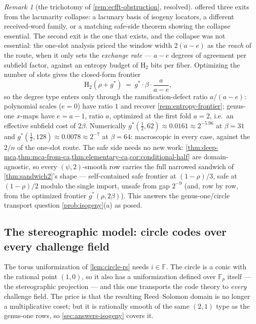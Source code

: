 \documentclass[11pt]{article}
\theoremstyle{definition}
\theoremstyle{remark}
\newtheorem{remark}[remark]{Remark}
\newcommand{\F}{\mathbb{F}}
\newcommand{\Hb}{\mathrm{H}_2}
\begin{document}
\begin{remark}[the trichotomy of \cref{rem:ecfft-obstruction}, resolved]\label{rem:trichotomy}
 offered three exits from the lacunarity collapse: a lacunary basis of isogeny locators, a different received-word family, or a matching safe-side theorem showing the collapse essential. The second exit is the one that exists, and the collapse was not essential: the one-slot analysis priced the window width $2(a-e)$ as the \emph{reach} of the route, when it only sets the \emph{exchange rate} --- $a-e$ degrees of agreement per subfield factor, against an entropy budget of $\Hb$ bits per fiber. Optimizing the number of slots gives the closed-form frontier
\[
\Hb(\rho+g^*)\ =\ g^*\cdot\beta\cdot\frac a{a-e},
\]
so the degree type enters only through the ramification-defect ratio $a/(a-e)$: polynomial scales ($e=0$) have ratio $1$ and recover \cref{rem:entropy-frontier}; genus-one $x$-maps have $e=a-1$, ratio $a$, optimized at the first fold $a=2$, i.e.\ an effective subfield cost of $2\beta$. Numerically $g^*(\tfrac12,62)\approx0.0161\approx2^{-5.96}$ at $\beta=31$ and $g^*(\tfrac12,128)\approx0.0078\approx2^{-7}$ at $\beta=64$: macroscopic in every case, against the $2/n$ of the one-slot route. The safe side needs no new work: \cref{thm:deep-mca,thm:mca-from-ca,thm:elementary-ca,cor:conditional-half} are domain-agnostic, so every $(\psi,2)$-smooth row carries the full narrowed sandwich of \cref{thm:sandwich2}'s shape --- self-contained safe frontier at $(1-\rho)/3$, safe at $(1-\rho)/2$ modulo the single import, unsafe from gap $2^{-9}$ \textup(and, row by row, from the optimized frontier $g^*(\rho,2\beta)$\textup). This answers the genus-one/circle transport question \cref{prob:isogeny}\textup{(a)} as posed.
\end{remark}

\subsection{The stereographic model: circle codes over every challenge field}\label{sec:answers-stereo}

The torus uniformization of \cref{lem:circle-rs} needs $i\in\F$. The circle is a conic with the rational point $(1,0)$, so it also has a uniformization defined over $\F_p$ itself --- the stereographic projection --- and this one transports the code theory to \emph{every} challenge field. The price is that the resulting Reed--Solomon domain is no longer a multiplicative coset; but it is rationally smooth of the same $(2,1)$ type as the genus-one rows, so \cref{sec:answers-isogeny} covers it.
\end{document}
